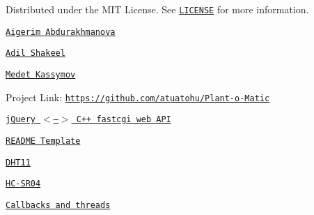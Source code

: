 Distributed under the M\+IT License. See \href{https://github.com/atuatohu/Plant-o-Matic/blob/main/LICENSE}{\tt L\+I\+C\+E\+N\+SE} for more information.

\href{https://github.com/Aigerim98}{\tt Aigerim Abdurakhmanova}

\href{https://github.com/2624480S}{\tt Adil Shakeel}

\href{https://github.com/atuatohu}{\tt Medet Kassymov}

Project Link\+: \href{https://github.com/atuatohu/Plant-o-Matic}{\tt https\+://github.\+com/atuatohu/\+Plant-\/o-\/\+Matic}


\begin{DoxyItemize}
\item \href{https://github.com/berndporr/json_fastcgi_web_api}{\tt j\+Query $<$--$>$ C++ fastcgi web A\+PI}
\item \href{https://github.com/othneildrew/Best-README-Template}{\tt R\+E\+A\+D\+ME Template}
\item \href{https://www.circuitbasics.com/how-to-set-up-the-dht11-humidity-sensor-on-the-raspberry-pi/}{\tt D\+H\+T11}
\item \href{http://www.piprojects.xyz/ultrasonic-distance-sensor/}{\tt H\+C-\/\+S\+R04}
\item \href{https://github.com/berndporr/rpi_AD7705_daq}{\tt Callbacks and threads} 
\end{DoxyItemize}